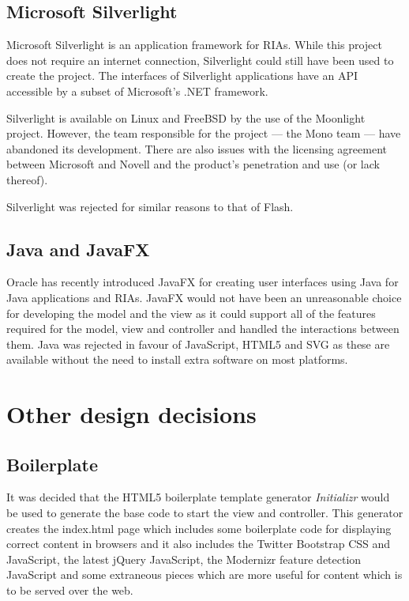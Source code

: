 \subsection{Microsoft Silverlight}
Microsoft Silverlight is an application framework for RIAs. While this project does not require an internet connection, Silverlight could still have been used to create the project. The interfaces of Silverlight applications have an API accessible by a subset of Microsoft's .NET framework.

Silverlight is available on Linux and FreeBSD by the use of the Moonlight project. However, the team responsible for the project --- the Mono team --- have abandoned its development. There are also issues with the licensing agreement between Microsoft and Novell and the product's penetration and use (or lack thereof).

Silverlight was rejected for similar reasons to that of Flash.

\subsection{Java and JavaFX}
Oracle has recently introduced JavaFX for creating user interfaces using Java for Java applications and RIAs. JavaFX would not have been an unreasonable choice for developing the model and the view as it could support all of the features required for the model, view and controller and handled the interactions between them. Java was rejected in favour of Java\-Script, HTML5 and SVG as these are available without the need to install extra software on most platforms.

\section{Other design decisions}
\subsection{Boilerplate}
It was decided that the HTML5 boilerplate template generator \emph{Initializr} would be used to generate the base code to start the view and controller. This generator creates the index.html page which includes some boilerplate code for displaying correct content in browsers and it also includes the Twitter Bootstrap CSS and Java\-Script, the latest jQuery Java\-Script, the Modernizr feature detection Java\-Script and some extraneous pieces which are more useful for content which is to be served over the web.

